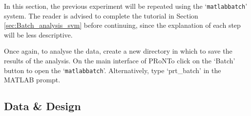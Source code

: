 In this section, the previous experiment will be repeated using the `\texttt{matlabbatch}' system. The reader is advised to complete the tutorial in Section \ref{sec:Batch_analysis_svm} before continuing, since the explanation of each step will be less descriptive.

Once again, to analyse the data, create a new directory in which to save the results of the analysis. On the main interface of PRoNTo click on the `Batch' button to open the `{\tt matlabbatch}'. Alternatively, type `prt\_batch' in the MATLAB prompt.


\subsection{Data \& Design}

